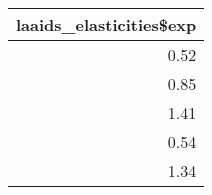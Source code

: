 \begin{table}[ht]
\centering
\begin{tabular}{r}
  \hline
laaids\_elasticities\$exp \\ 
  \hline
0.52 \\ 
  0.85 \\ 
  1.41 \\ 
  0.54 \\ 
  1.34 \\ 
   \hline
\end{tabular}
\end{table}
